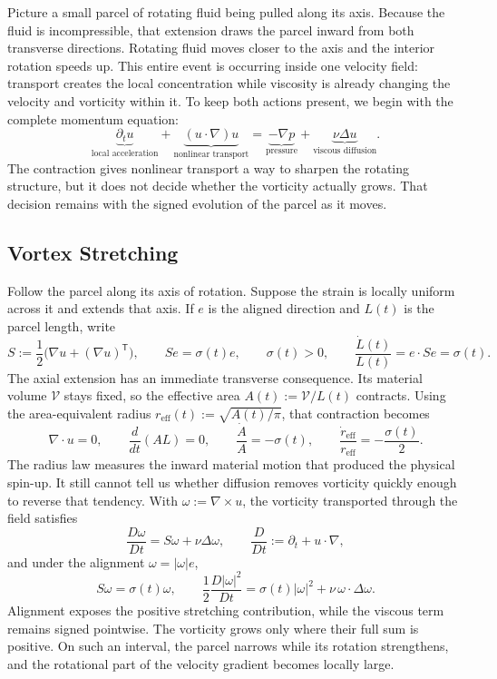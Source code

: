 
Picture a small parcel of rotating fluid being pulled along its axis. Because the fluid is incompressible, that extension draws the parcel inward from both transverse directions. Rotating fluid moves closer to the axis and the interior rotation speeds up. This entire event is occurring inside one velocity field: transport creates the local concentration while viscosity is already changing the velocity and vorticity within it. To keep both actions present, we begin with the complete momentum equation:
\[
  \underbrace{\partial_t u}_{\text{local acceleration}}
  +
  \underbrace{(u\cdot\nabla)u}_{\text{nonlinear transport}}
  =
  \underbrace{-\nabla p}_{\text{pressure}}
  +
  \underbrace{\nu\Delta u}_{\text{viscous diffusion}}.
\]
The contraction gives nonlinear transport a way to sharpen the rotating structure, but it does not decide whether the vorticity actually grows. That decision remains with the signed evolution of the parcel as it moves.

\subsection{Vortex Stretching}\label{sub:ThePerfectlyStretchingVortex}

Follow the parcel along its axis of rotation. Suppose the strain is locally uniform across it and extends that axis. If \(e\) is the aligned direction and \(L(t)\) is the parcel length, write
\[
  S:=\frac12\bigl(\nabla u+(\nabla u)^{\mathsf T}\bigr),
  \qquad
  Se=\sigma(t)e,
  \qquad
  \sigma(t)>0,
  \qquad
  \frac{\dot L(t)}{L(t)}
  =
  e\cdot Se
  =
  \sigma(t).
\]
The axial extension has an immediate transverse consequence. Its material volume \(\mathcal V\) stays fixed, so the effective area \(A(t):=\mathcal V/L(t)\) contracts. Using the area-equivalent radius \(r_{\mathrm{eff}}(t):=\sqrt{A(t)/\pi}\), that contraction becomes
\[
  \nabla\cdot u=0,
  \qquad
  \frac{d}{dt}(A L)=0,
  \qquad
  \frac{\dot A}{A}=-\sigma(t),
  \qquad
  \frac{\dot r_{\mathrm{eff}}}{r_{\mathrm{eff}}}
  =
  -\frac{\sigma(t)}{2}.
\]
The radius law measures the inward material motion that produced the physical spin-up. It still cannot tell us whether diffusion removes vorticity quickly enough to reverse that tendency. With \(\omega:=\nabla\times u\), the vorticity transported through the field satisfies
\[
  \frac{D\omega}{Dt}
  =
  S\omega+\nu\Delta\omega,
  \qquad
  \frac{D}{Dt}
  :=
  \partial_t+u\cdot\nabla,
\]
and under the alignment \(\omega=|\omega|e\),
\[
  S\omega
  =
  \sigma(t)\omega,
  \qquad
  \frac12\frac{D|\omega|^2}{Dt}
  =
  \sigma(t)|\omega|^2
  +
  \nu\,\omega\cdot\Delta\omega.
\]
Alignment exposes the positive stretching contribution, while the viscous term remains signed pointwise. The vorticity grows only where their full sum is positive. On such an interval, the parcel narrows while its rotation strengthens, and the rotational part of the velocity gradient becomes locally large.


